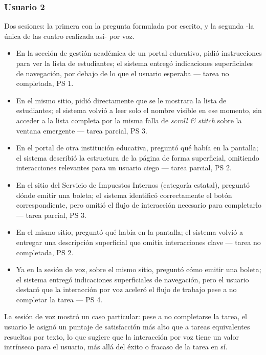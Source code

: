\subsubsection{Usuario 2}

Dos sesiones: la primera con la pregunta formulada por escrito, y la segunda -la única de las cuatro realizada así- por voz.

\begin{itemize}
    \item En la sección de gestión académica de un portal educativo, pidió instrucciones para ver la lista de estudiantes; el sistema entregó indicaciones superficiales de navegación, por debajo de lo que el usuario esperaba — tarea no completada, PS 1.
    \item En el mismo sitio, pidió directamente que se le mostrara la lista de estudiantes; el sistema volvió a leer solo el nombre visible en ese momento, sin acceder a la lista completa por la misma falla de \textit{scroll \& stitch} sobre la ventana emergente — tarea parcial, PS 3.
    \item En el portal de otra institución educativa, preguntó qué había en la pantalla; el sistema describió la estructura de la página de forma superficial, omitiendo interacciones relevantes para un usuario ciego — tarea parcial, PS 2.
    \item En el sitio del Servicio de Impuestos Internos (categoría estatal), preguntó dónde emitir una boleta; el sistema identificó correctamente el botón correspondiente, pero omitió el flujo de interacción necesario para completarlo — tarea parcial, PS 3.
    \item En el mismo sitio, preguntó qué había en la pantalla; el sistema volvió a entregar una descripción superficial que omitía interacciones clave — tarea no completada, PS 2.
    \item Ya en la sesión de voz, sobre el mismo sitio, preguntó cómo emitir una boleta; el sistema entregó indicaciones superficiales de navegación, pero el usuario destacó que la interacción por voz aceleró el flujo de trabajo pese a no completar la tarea — PS 4.
\end{itemize}

La sesión de voz mostró un caso particular: pese a no completarse la tarea, el usuario le asignó un puntaje de satisfacción más alto que a tareas equivalentes resueltas por texto, lo que sugiere que la interacción por voz tiene un valor intrínseco para el usuario, más allá del éxito o fracaso de la tarea en sí.


